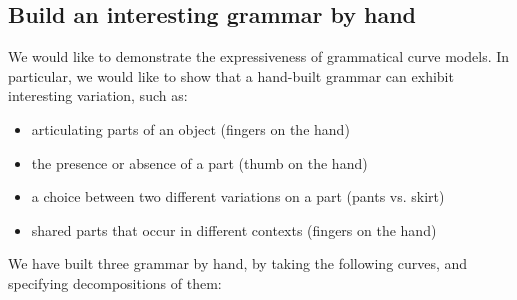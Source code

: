 

\subsection{Build an interesting grammar by hand}

We would like to demonstrate the expressiveness of grammatical curve
models. In particular, we would like to show that a hand-built grammar
can exhibit interesting variation, such as:
\begin{itemize}      
 \item articulating parts of an object (fingers on the hand)
 \item the presence or absence of a part (thumb on the hand)
 \item a choice between two different variations on a part (pants vs. skirt)
 \item shared parts that occur in different contexts (fingers on the hand)
\end{itemize}


We have built three grammar by hand, by taking the following curves, and
specifying decompositions of them:

